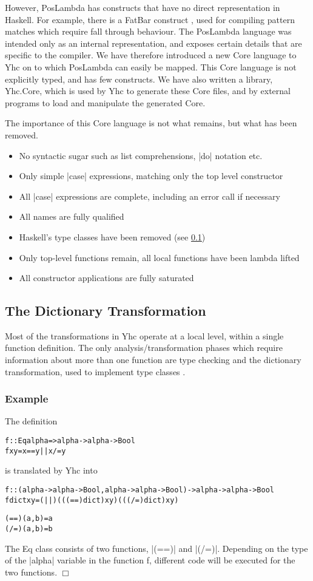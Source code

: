 \documentclass[preprint]{sigplanconf}
\let\cite=\citep
\newcommand{\C}[1]{\textsf{#1}}
\newcounter{exmp}
\newcommand{\yesexample}{\subsubsection*{Example \arabic{exmp}}\addtocounter{exmp}{1}}
\newcommand{\noexample}{\hfill$\Box$}
\newenvironment{code}{\begin{alltt}\small}{\end{alltt}}
\newenvironment{example}{\yesexample}{\noexample}
\begin{document}
However, PosLambda has constructs that have no direct representation in Haskell. For example, there is a FatBar construct \cite{spj:implementation}, used for compiling pattern matches which require fall through behaviour. The PosLambda language was intended only as an internal representation, and exposes certain details that are specific to the compiler. We have therefore introduced a new Core language to Yhc on to which PosLambda can easily be mapped. This Core language is not explicitly typed, and has few constructs. We have also written a library, Yhc.Core, which is used by Yhc to generate these Core files, and by external programs to load and manipulate the generated Core.

The importance of this Core language is not what remains, but what has been removed.

\begin{itemize}
\item No syntactic sugar such as list comprehensions, |do| notation etc.
\item Only simple |case| expressions, matching only the top level constructor
\item All |case| expressions are complete, including an \C{error} call if necessary
\item All names are fully qualified
\item Haskell's type classes have been removed (see \ref{sec:dict})
\item Only top-level functions remain, all local functions have been lambda lifted
\item All constructor applications are fully saturated
\end{itemize}

\subsection{The Dictionary Transformation}
\label{sec:dict}

Most of the transformations in Yhc operate at a local level, within a single function definition. The only analysis/transformation phases which require information about more than one function are type checking and the dictionary transformation, used to implement type classes \citep{wadler:type_classes}.

\begin{example}
The definition

\begin{code}
f :: Eq alpha => alpha -> alpha -> Bool
f x y = x == y || x /= y
\end{code}

\noindent is translated by Yhc into

\begin{code}
f :: (alpha -> alpha -> Bool, alpha -> alpha -> Bool) -> alpha -> alpha -> Bool
f dict x y = (||) (((==) dict) x y) (((/=) dict) x y)

(==) (a,b) = a
(/=) (a,b) = b
\end{code}

The \C{Eq} class consists of two functions, |(==)| and |(/=)|. Depending on the type of the |alpha| variable in the function \C{f}, different code will be executed for the two functions.
\end{example}
\end{document}
